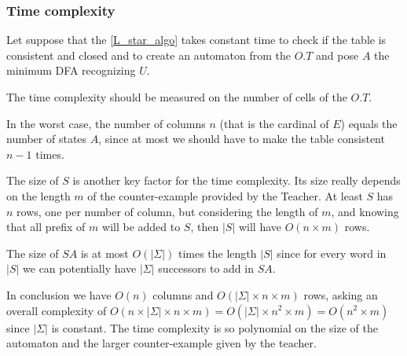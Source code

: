 \subsubsection{Time complexity}
Let suppose that the \cref{L_star_algo} takes constant time to check if the table is consistent and closed and to create an automaton from the $O.T$ and pose $A$ the minimum DFA recognizing $U$.

The time complexity should be measured on the number of cells of the $O.T$.

In the worst case, the number of columns $n$ (that is the cardinal of $E$) equals the number of states $A$, since at most we should have to make the table consistent $n-1$ times.

The size of $S$ is another key factor for the time complexity. Its size really depends on the length $m$ of the counter-example provided by the Teacher. At least $S$ has $n$ rows, one per number of column, but considering the length of $m$, and knowing that all prefix of $m$ will be added to $S$, then $|S|$ will have $O(n \times m)$ rows.

The size of $SA$ is at most $O(|\Sigma|)$ times the length $|S|$ since for every word in $|S|$ we can potentially have $|\Sigma|$ successors to add in $SA$.

In conclusion we have $O(n)$ columns and $O(|\Sigma| \times n \times m)$ rows, asking an overall complexity of $O(n \times |\Sigma| \times n \times m) = O(|\Sigma| \times n^2 \times m) = O(n^2 \times m)$ since $|\Sigma|$ is constant. The time complexity is so polynomial on the size of the automaton and the larger counter-example given by the teacher.